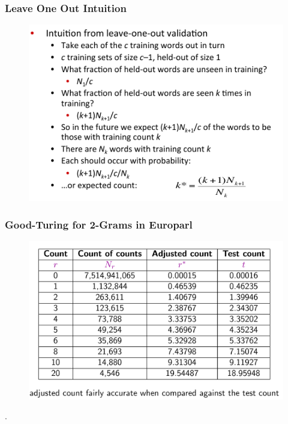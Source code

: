 \documentclass{beamer}
\begin{document}
\begin{frame}\frametitle{Leave One Out Intuition}
\begin{figure}
\includegraphics[width=0.9\linewidth]{figure/good_turing_loo_intuition.pdf}
\label{fig:good_turing_loo_intuition}
\end{figure}
\end{frame}


\begin{frame}[label=go_good_turing]\frametitle{Good-Turing for 2-Grams in Europarl}
\begin{figure}
\includegraphics[width=0.9\linewidth]{figure/good_turing_2gram.pdf}
\end{figure}
\hyperlink{go_absolute_discounting}{}.
\end{frame}
\end{document}
